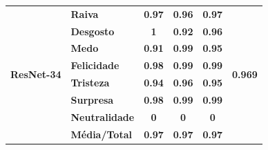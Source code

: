 \begin{table}[]
\begin{tabular}{llcccc}
\multirow{8}{*}{\textbf{ResNet-34}} & \textbf{Raiva}        & \textbf{0.97}                         & \textbf{0.96}                          & \textbf{0.97}                         & \multirow{8}{*}{\textbf{0.969}}       \\
                                       & \textbf{Desgosto}     & \textbf{1}                            & \textbf{0.92}                          & \textbf{0.96}                         &                                       \\
                                       & \textbf{Medo}         & \textbf{0.91}                         & \textbf{0.99}                          & \textbf{0.95}                         &                                       \\
                                       & \textbf{Felicidade}   & \textbf{0.98}                         & \textbf{0.99}                          & \textbf{0.99}                         &                                       \\
                                       & \textbf{Tristeza}     & \textbf{0.94}                         & \textbf{0.96}                          & \textbf{0.95}                         &                                       \\
                                       & \textbf{Surpresa}     & \textbf{0.98}                         & \textbf{0.99}                          & \textbf{0.99}                         &                                       \\
                                       & \textbf{Neutralidade} & \textbf{0}                            & \textbf{0}                             & \textbf{0}                            &                                       \\
                                       & \textbf{Média/Total}  & \textbf{0.97}                         & \textbf{0.97}                          & \textbf{0.97}                         &                                       \\ \hline
\end{tabular}
\end{table}


